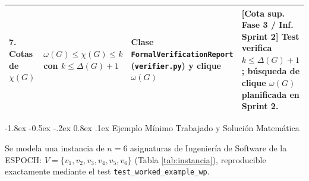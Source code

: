 \documentclass[12pt,a4paper]{article}
\makeatletter
\renewcommand\section{\@startsection {section}{1}{\z@}%
                                   {-1.8ex \@plus -0.5ex \@minus -.2ex}%
                                   {0.8ex \@plus.1ex}%
                                   {\normalfont\large\bfseries}}
\theoremstyle{definition}
\makeatother
\begin{document}
\begin{singlespace}
\begin{table}[H]
\begin{tabularx}{\textwidth}{|L{2.2cm}|L{3.1cm}|L{3.8cm}|Y|}
7. Cotas de $\chi(G)$ & $\omega(G) \le \chi(G) \le k$ con $k \le \Delta(G) + 1$ & Clase \texttt{FormalVerification}\newline\texttt{Report} (\texttt{verifier.py}) y clique $\omega(G)$ & \textbf{[Cota sup. Fase 3 / Inf. Sprint 2]} Test verifica $k \le \Delta(G)+1$; búsqueda de clique $\omega(G)$ planificada en Sprint 2. \\ \hline
\end{tabularx}
\end{table}
\end{singlespace}

\section{Ejemplo Mínimo Trabajado y Solución Matemática}

Se modela una instancia de $n = 6$ asignaturas de Ingeniería de Software de la ESPOCH: $V = \{v_1, v_2, v_3, v_4, v_5, v_6\}$ (Tabla \ref{tab:instancia}), reproducible exactamente mediante el test \texttt{test\_worked\_example\_wp}.
\end{document}
